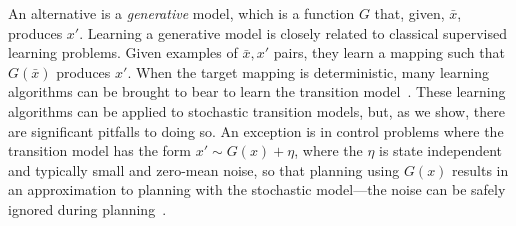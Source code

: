 \documentclass[letterpaper]{article} %
\begin{document}
An alternative is a \emph{generative} model, which is a function $G$ that, given, $\bar{x}$, produces $x'$.
%
%
Learning a generative model is closely related to classical supervised learning problems. Given examples of $\bar{x},x'$ pairs, they learn a mapping such that $G(\bar{x})$ produces $x'$. When the target mapping is deterministic, many learning algorithms can be brought to bear to learn the transition model~\cite{atkeson97b}.
These learning algorithms can be applied to stochastic transition models, but, as we show, there are significant pitfalls to doing so. An exception is in control problems where the transition model has the form $x' \sim G(x) + \eta$, where the $\eta$ is state independent and typically small and zero-mean noise, so that planning using $G(x)$ results in an approximation to planning with the stochastic model---the noise can be safely ignored during planning~\cite{Bradtke93}.

\end{document}
